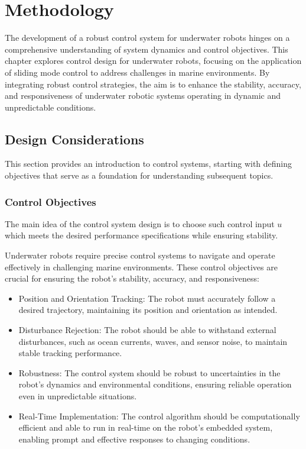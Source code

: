 \chapter{Methodology}
\label{chap:ctrl}


    The development of a robust control system for underwater robots hinges on a 
    comprehensive understanding of system dynamics and control objectives.
    This chapter explores control design for underwater robots, focusing on the application 
    of sliding mode control to address challenges in marine environments. By integrating 
    robust control strategies, the aim is to enhance the stability, accuracy, and 
    responsiveness of underwater robotic systems operating in dynamic and unpredictable conditions.

\section{Design Considerations}

    This section provides an introduction to control systems, starting with defining objectives 
    that serve as a foundation for understanding subsequent topics.

    \subsection{Control Objectives}

    The main idea of the control system design is to choose such control input $u$ which 
    meets the desired performance specifications while ensuring stability.

    Underwater robots require precise control systems to navigate and operate effectively
    in challenging marine environments. These control objectives are crucial for ensuring
    the robot's stability, accuracy, and responsiveness:
    \begin{itemize}
        \item Position and Orientation Tracking:
            The robot must accurately follow a desired trajectory, maintaining its position
            and orientation as intended.
        \item Disturbance Rejection:
            The robot should be able to withstand external disturbances, such as ocean
            currents, waves, and sensor noise, to maintain stable tracking performance.
        \item Robustness:
            The control system should be robust to uncertainties in the robot's dynamics
            and environmental conditions, ensuring reliable operation even in unpredictable
            situations.
        \item Real-Time Implementation:
            The control algorithm should be computationally efficient and able to run in
            real-time on the robot's embedded system, enabling prompt and effective
            responses to changing conditions.
    \end{itemize}

